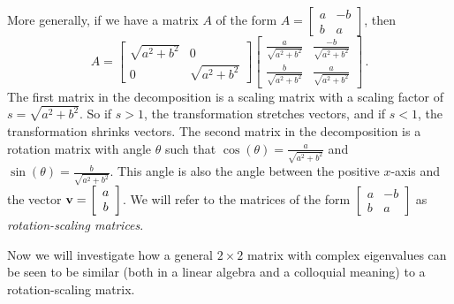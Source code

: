 More generally, if we have a matrix $A$ of the form $A=\left[ \begin{array}{cr} a&-b \\ b&a \end{array} \right]$, then 
\[ A = \left[ \begin{array}{cc} \sqrt{a^2+b^2} &0 \\ 0&\sqrt{a^2+b^2} \end{array} \right] \left[ \begin{array}{cc} \frac{a}{\sqrt{a^2+b^2}}&\frac{-b}{\sqrt{a^2+b^2}} \\ \frac{b}{\sqrt{a^2+b^2}}&\frac{a}{\sqrt{a^2+b^2}}\end{array} \right] \, .\]
The first matrix in the decomposition is a scaling matrix with a scaling factor of $s=\sqrt{a^2+b^2}$. So if $s>1$, the transformation stretches vectors, and if $s<1$, the transformation shrinks vectors. The second matrix in the decomposition is a rotation matrix with angle $\theta$ such that $\cos(\theta)=\frac{a}{\sqrt{a^2+b^2}}$ and $\sin(\theta)=\frac{b}{\sqrt{a^2+b^2}}$. This angle is also the angle between the positive $x$-axis and the vector $\mathbf{v}=\left[ \begin{array}{c} a\\ b\end{array} \right]$. We will refer to the matrices of the form $\left[ \begin{array}{cr} a&-b \\ b&a \end{array} \right]$ as \emph{rotation-scaling matrices}. 

\label{sec:mtx_comp_eigen}

Now we will investigate how a general $2\times 2$ matrix with complex eigenvalues can be seen to be similar (both in a linear algebra and a colloquial meaning) to a rotation-scaling matrix.



